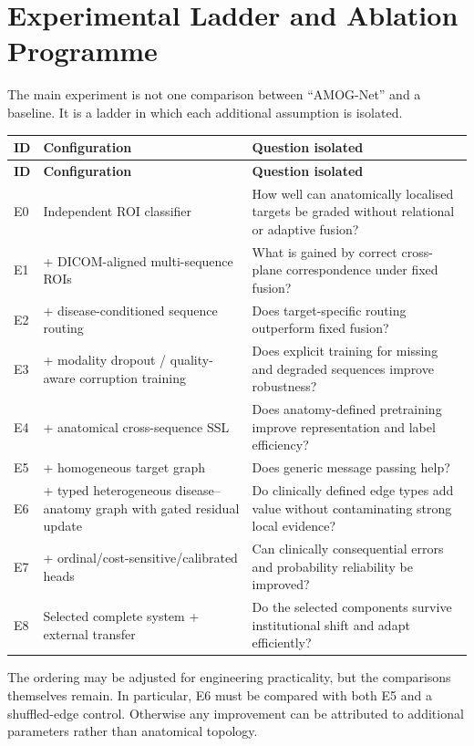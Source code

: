 \section{Experimental Ladder and Ablation Programme}
\label{sec:method-ablation}

The main experiment is not one comparison between ``AMOG-Net'' and a baseline.
It is a ladder in which each additional assumption is isolated.

\begin{longtable}{p{1.1cm}p{5.0cm}p{7.2cm}}
\toprule
\textbf{ID} & \textbf{Configuration} & \textbf{Question isolated}\\
\midrule
\endfirsthead
\toprule
\textbf{ID} & \textbf{Configuration} & \textbf{Question isolated}\\
\midrule
\endhead
E0 & Independent ROI classifier & How well can anatomically localised targets be graded without relational or adaptive fusion?\\
E1 & + DICOM-aligned multi-sequence ROIs & What is gained by correct cross-plane correspondence under fixed fusion?\\
E2 & + disease-conditioned sequence routing & Does target-specific routing outperform fixed fusion?\\
E3 & + modality dropout / quality-aware corruption training & Does explicit training for missing and degraded sequences improve robustness?\\
E4 & + anatomical cross-sequence SSL & Does anatomy-defined pretraining improve representation and label efficiency?\\
E5 & + homogeneous target graph & Does generic message passing help?\\
E6 & + typed heterogeneous disease--anatomy graph with gated residual update & Do clinically defined edge types add value without contaminating strong local evidence?\\
E7 & + ordinal/cost-sensitive/calibrated heads & Can clinically consequential errors and probability reliability be improved?\\
E8 & Selected complete system + external transfer & Do the selected components survive institutional shift and adapt efficiently?\\
\bottomrule
\end{longtable}

The ordering may be adjusted for engineering practicality, but the comparisons
themselves remain. In particular, E6 must be compared with both E5 and a
shuffled-edge control. Otherwise any improvement can be attributed to additional
parameters rather than anatomical topology.

